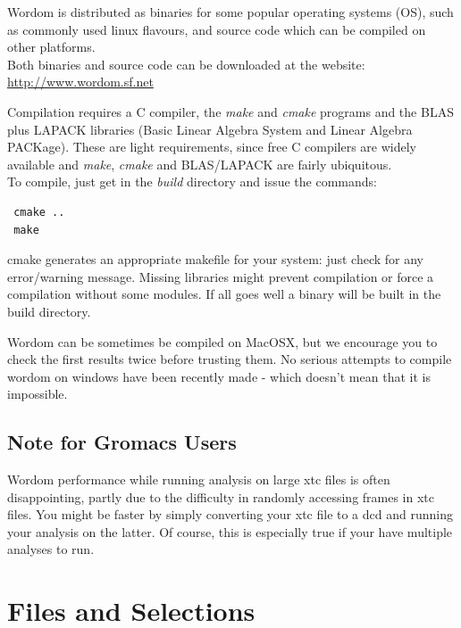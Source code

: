 \documentclass[11pt,twoside,onecolumn,a4paper,openright,notitlepage]{book}[2001/04/21]
\begin{document}
Wordom is distributed as binaries for some popular operating systems (OS), such as commonly used linux flavours, and source code which can be compiled on other platforms.\\
Both binaries and source code can be downloaded at the website:\\
\url{http://www.wordom.sf.net}

Compilation requires a C compiler, the \emph{make} and \emph{cmake} programs and the BLAS plus LAPACK libraries (Basic Linear Algebra System and Linear Algebra PACKage). These are
light requirements, since free C compilers are widely available and
\emph{make}, \emph{cmake} and BLAS/LAPACK are fairly ubiquitous.\\

To compile, just get in the \emph{build} directory and issue the commands:\\

\begin{verbatim}
 cmake ..
 make
\end{verbatim}

cmake generates an appropriate makefile for your system: just check for any error/warning message. Missing libraries might prevent compilation or force a compilation without some modules. If all goes well a binary will be built in the build directory.

Wordom can be sometimes be compiled on MacOSX, but we encourage you to check the first results twice before trusting them. No serious attempts to compile wordom on windows have been recently made - which doesn't mean that it is impossible.

\section{Note for Gromacs Users}
Wordom performance while running analysis on large xtc files is often disappointing, partly due to the difficulty in randomly accessing frames in xtc files. You might be faster by simply converting your xtc file to a dcd and running your analysis on the latter. Of course, this is especially true if your have multiple analyses to run.\\



\chapter{Files and Selections}
\end{document}
